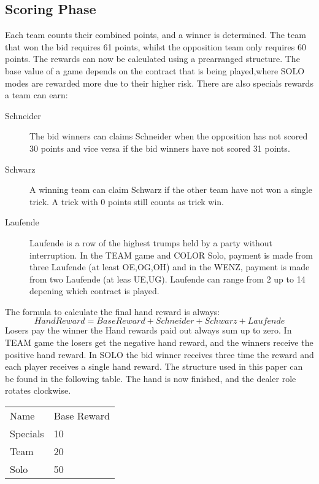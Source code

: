 \subsection{Scoring Phase}
Each team counts their combined points, and a winner is determined.
The team that won the bid requires 61 points, whilst the opposition team only requires 60 points.
The rewards can now be calculated using a prearranged structure.
The base value of a game depends on the contract
that is being played,where SOLO modes are rewarded more due to their higher risk.
\newline
There are also specials rewards a team can earn:
\begin{description}
    \item[Schneider] The bid winners can claims Schneider when the opposition has not scored 30 points and vice versa
    if the bid winners have not scored 31 points.
    \item[Schwarz] A winning team can claim Schwarz if the other team have not won a single trick. A trick with 0
    points still counts as trick win.
    \item[Laufende] Laufende is a row of the highest trumps held by a party without interruption.
    In the TEAM game and COLOR Solo, payment is made from three Laufende (at least OE,OG,OH) and in the WENZ,
    payment is made from two Laufende (at leas UE,UG). Laufende can range from 2 up to 14 depening which contract is
    played.
\end{description}
The formula to calculate the final hand reward is always:
\begin{equation*}
    Hand Reward = Base Reward + Schneider + Schwarz + Laufende
\end{equation*}
Losers pay the winner the Hand rewards paid out always sum up to zero.
In TEAM game the losers get the negative hand reward, and the winners receive the positive hand reward.
In SOLO the bid winner receives three time the reward and each player receives a single hand reward.
The structure used in this paper can be found in the following table.
The hand is now finished, and the dealer role rotates clockwise.
\begin{table}[]
\begin{tabular}{ll}
Name     & Base Reward \\
Specials & 10          \\
Team     & 20          \\
Solo     & 50    
\end{tabular}\label{tab:table3}
\end{table}
